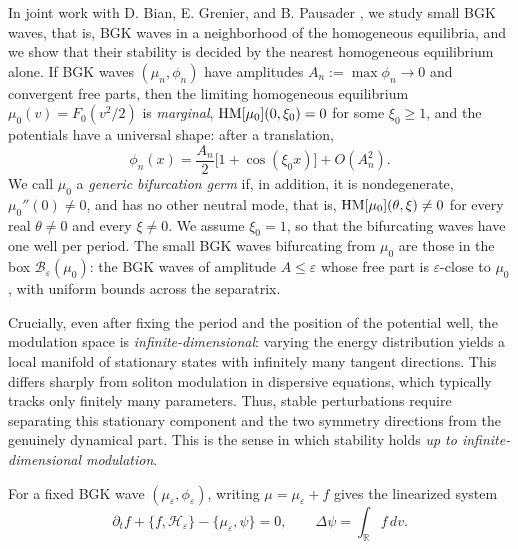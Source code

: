 \documentclass[10pt,reqno]{amsart}
\theoremstyle{definition}
\begin{document}
In joint work with D. Bian, E. Grenier, and B. Pausader \cite{BGHP26}, we study small BGK waves, that is, BGK waves in a neighborhood of the homogeneous equilibria, and we show that their stability is decided by the nearest homogeneous equilibrium alone. If BGK waves $(\mu_n,\phi_n)$ have amplitudes $A_n:=\max\phi_n\to0$ and convergent free parts, then the limiting homogeneous equilibrium $\mu_0(v)=F_0(v^2/2)$ is \emph{marginal}, $\mathrm{HM}[\mu_0](0,\xi_0)=0$ for some $\xi_0\geq1$, and the potentials have a universal shape: after a translation,
\[
\phi_n(x)=\frac{A_n}{2}\bigl[1+\cos(\xi_0x)\bigr]+O(A_n^2).
\]
We call $\mu_0$ a \emph{generic bifurcation germ} if, in addition, it is nondegenerate, $\mu_0''(0)\neq0$, and has no other neutral mode, that is, $\mathrm{HM}[\mu_0](\theta,\xi)\neq0$ for every real $\theta\neq0$ and every $\xi\neq0$. We assume $\xi_0=1$, so that the bifurcating waves have one well per period. The small BGK waves bifurcating from $\mu_0$ are those in the box $\mathcal B_\varepsilon(\mu_0)$: the BGK waves of amplitude $A\leq\varepsilon$ whose free part is $\varepsilon$-close to $\mu_0$, with uniform bounds across the separatrix.

{Crucially, even after fixing the period and the position of the potential well, the modulation space is {\emph {infinite-dimensional}}: varying the energy distribution yields a local manifold of stationary states with infinitely many tangent directions. This differs sharply from soliton modulation in dispersive equations, which typically tracks only finitely many parameters. Thus, stable perturbations require separating this stationary component and the two symmetry directions from the genuinely dynamical part. This is the sense in which stability holds \emph{up to infinite-dimensional modulation}.}

For a fixed BGK wave $(\mu_\varepsilon,\phi_\varepsilon)$, writing $\mu=\mu_\varepsilon+f$ gives the linearized system
\begin{equation}\label{LVP}
\partial_tf+\{f,\mathcal H_\varepsilon\}-\{\mu_\varepsilon,\psi\}=0,
\qquad
\Delta\psi=\int_{\mathbb R}f\,dv.
\end{equation}
\end{document}
